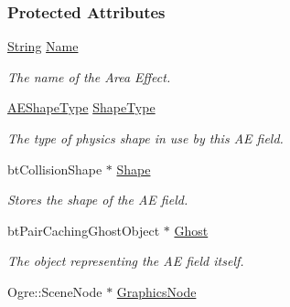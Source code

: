 \subsubsection*{Protected Attributes}
\begin{DoxyCompactItemize}
\item 
\hypertarget{classphys_1_1AreaEffect_a1cf5a878eb22b30a166f5b065944a986}{
\hyperlink{namespacephys_aa03900411993de7fbfec4789bc1d392e}{String} \hyperlink{classphys_1_1AreaEffect_a1cf5a878eb22b30a166f5b065944a986}{Name}}
\label{classphys_1_1AreaEffect_a1cf5a878eb22b30a166f5b065944a986}

\begin{DoxyCompactList}\small\item\em The name of the Area Effect. \item\end{DoxyCompactList}\item 
\hypertarget{classphys_1_1AreaEffect_a1465c564cc8e32b8a530881c5db70b88}{
\hyperlink{classphys_1_1AreaEffect_a99b8746c43eac266d48ad613110dc6f9}{AEShapeType} \hyperlink{classphys_1_1AreaEffect_a1465c564cc8e32b8a530881c5db70b88}{ShapeType}}
\label{classphys_1_1AreaEffect_a1465c564cc8e32b8a530881c5db70b88}

\begin{DoxyCompactList}\small\item\em The type of physics shape in use by this AE field. \item\end{DoxyCompactList}\item 
\hypertarget{classphys_1_1AreaEffect_af8189f9e8dc4bf04f44550918e0ee117}{
btCollisionShape $\ast$ \hyperlink{classphys_1_1AreaEffect_af8189f9e8dc4bf04f44550918e0ee117}{Shape}}
\label{classphys_1_1AreaEffect_af8189f9e8dc4bf04f44550918e0ee117}

\begin{DoxyCompactList}\small\item\em Stores the shape of the AE field. \item\end{DoxyCompactList}\item 
\hypertarget{classphys_1_1AreaEffect_ae730c591bf929404f337d71d4119bde8}{
btPairCachingGhostObject $\ast$ \hyperlink{classphys_1_1AreaEffect_ae730c591bf929404f337d71d4119bde8}{Ghost}}
\label{classphys_1_1AreaEffect_ae730c591bf929404f337d71d4119bde8}

\begin{DoxyCompactList}\small\item\em The object representing the AE field itself. \item\end{DoxyCompactList}\item 
\hypertarget{classphys_1_1AreaEffect_a7fbb785d7357cc7eac68dc94bb72c18a}{
Ogre::SceneNode $\ast$ \hyperlink{classphys_1_1AreaEffect_a7fbb785d7357cc7eac68dc94bb72c18a}{GraphicsNode}}
\label{classphys_1_1AreaEffect_a7fbb785d7357cc7eac68dc94bb72c18a}


\end{DoxyCompactItemize}
